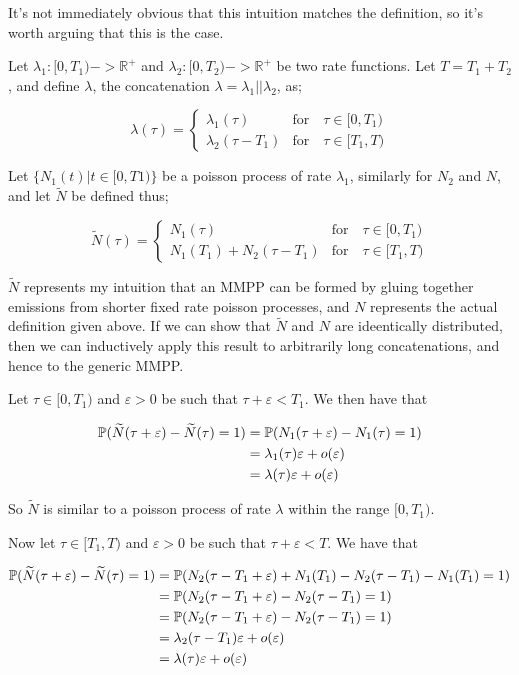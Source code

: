 It's not immediately obvious that this intuition matches the definition, so it's worth arguing that this is the case.

Let $\lambda_1: [0,T_1) -> \mathbb{R}^{+}$ and $\lambda_2:[0,T_2) -> \mathbb{R}^{+}$ be two rate functions. Let $T = T_1 + T_2$, and define $\lambda$, the concatenation $\lambda = \lambda_1 || \lambda_2$, as;

$$
\lambda(\tau) = 
\begin{cases}
	\lambda_1(\tau) & \mbox{for} \quad \tau \in [0,T_1)\\
	\lambda_2(\tau-T_1) & \mbox{for} \quad \tau \in [T_1,T)
\end{cases}
$$

Let $\{N_1(t) | t \in [0,T1)\}$ be a poisson process of rate $\lambda_1$, similarly for $N_2$ and $N$, and let $\widetilde{N}$ be defined thus;

$$
\widetilde{N}(\tau) = 
\begin{cases}
	N_1(\tau) & \mbox{for} \quad \tau \in [0,T_1)\\
	N_1(T_1) + N_2(\tau-T_1) & \mbox{for} \quad \tau \in [T_1,T)
\end{cases}
$$

$\widetilde{N}$ represents my intuition that an MMPP can be formed by gluing together emissions from shorter fixed rate poisson processes, and $N$ represents the actual definition given above. If we can show that $\widetilde{N}$ and $N$ are ideentically distributed, then we can inductively apply this result to arbitrarily long concatenations, and hence to the generic MMPP.

Let $\tau \in [0,T_1)$ and $\varepsilon>0$ be such that $\tau + \varepsilon < T_1$. We then have that

\begin{align*}
\mathbb{P} (\widetilde{N}(\tau+\varepsilon) - \widetilde{N}(\tau) = 1)
	&= \mathbb{P} (N_1(\tau+\varepsilon) - N_1(\tau) = 1) \\
	&= \lambda_1(\tau)\varepsilon + o(\varepsilon) \\
	&= \lambda(\tau)\varepsilon + o(\varepsilon)
\end{align*} 

So $\widetilde{N}$ is similar to a poisson process of rate $\lambda$ within the range $[0,T_1)$.

Now let $\tau \in [T_1,T)$ and $\varepsilon>0$ be such that $\tau + \varepsilon < T$. We have that

\begin{align*}
\mathbb{P} (\widetilde{N}(\tau+\varepsilon) - \widetilde{N}(\tau) = 1)
	&= \mathbb{P} (N_2(\tau-T_1+\varepsilon) + N_1(T_1) - N_2(\tau-T_1) - N_1(T_1)= 1)\\
	&= \mathbb{P} (N_2(\tau-T_1+\varepsilon) - N_2(\tau-T_1) = 1)\\
	&= \mathbb{P} (N_2(\tau-T_1+\varepsilon) - N_2(\tau-T_1) = 1)\\
	&= \lambda_2(\tau-T_1)\varepsilon + o(\varepsilon) \\
	&= \lambda(\tau)\varepsilon + o(\varepsilon)
\end{align*}


